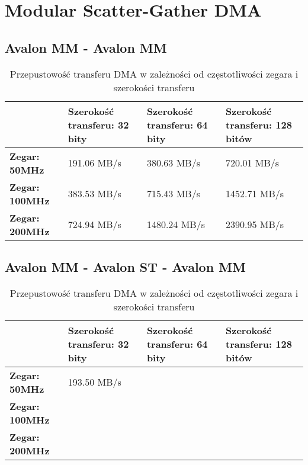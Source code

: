 \chapter{Modular Scatter-Gather DMA}

\section{Avalon MM - Avalon MM}

\begin{table}[h]
    \centering
    \begin{tabular}{|l|p{3.5cm}|p{3.5cm}|p{3.5cm}|}
    \hline
     & \textbf{Szerokość transferu: 32 bity} & \textbf{Szerokość transferu: 64 bity} & \textbf{Szerokość transferu: 128 bitów} \\ \hline
    \textbf{Zegar: 50MHz} & {191.06 MB/s} & {380.63 MB/s} & {720.01 MB/s} \\ \hline
    \textbf{Zegar: 100MHz} & {383.53 MB/s} & {715.43 MB/s} & {1452.71 MB/s} \\ \hline
    \textbf{Zegar: 200MHz} & {724.94 MB/s} & {1480.24 MB/s}  & {2390.95 MB/s} \\ \hline
    \end{tabular}
    \caption{Przepustowość transferu DMA w zależności od częstotliwości zegara i szerokości transferu}
    \label{tab:my_label}
\end{table}


\section{Avalon MM - Avalon ST - Avalon MM}

\begin{table}[h]
    \centering
    \begin{tabular}{|l|p{3.5cm}|p{3.5cm}|p{3.5cm}|}
    \hline
    & \textbf{Szerokość transferu: 32 bity} & \textbf{Szerokość transferu: 64 bity} & \textbf{Szerokość transferu: 128 bitów} \\ \hline
    \textbf{Zegar: 50MHz} & {193.50 MB/s} & {} & {} \\ \hline
    \textbf{Zegar: 100MHz} & {} & {} & {} \\ \hline
    \textbf{Zegar: 200MHz} & {} & {}  & {} \\ \hline
    \end{tabular}
    \caption{Przepustowość transferu DMA w zależności od częstotliwości zegara i szerokości transferu}
    \label{tab:my_label}
\end{table}